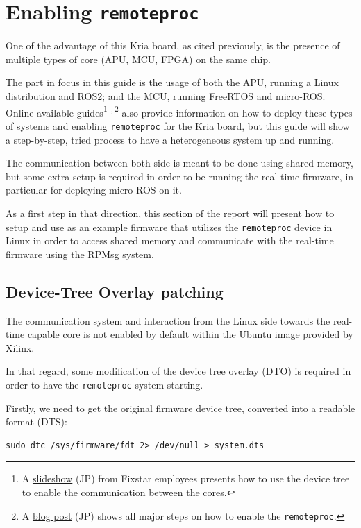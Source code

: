 \documentclass[10pt]{article}
\begin{document}
\section{Enabling \texttt{remoteproc}}
\label{sec:org0583105}
One of the advantage of this Kria board, as cited previously, is the presence of
multiple types of core (APU, MCU, FPGA) on the same chip.

The part in focus in this guide is the usage of both the APU, running
a Linux distribution and ROS2; and the MCU, running FreeRTOS and micro-ROS.
Online available guides\footnote{A \href{https://speakerdeck.com/fixstars/fpga-seminar-12-fixstars-corporation-20220727}{slideshow} (JP) from Fixstar employees presents how to use the device
tree to enable the communication between the cores.} \textsuperscript{,}\,\footnote{A \href{https://zenn.dev/ryuz88/articles/kv260\_setup\_memo\_ubuntu22 }{blog post} (JP) shows all major steps on how to enable the \texttt{remoteproc}.} also provide information on how to deploy these types
of systems and enabling \texttt{remoteproc} for the Kria board, but this guide
will show a step-by-step, tried process to have a heterogeneous system
up and running.

The communication between both side is meant to be done using shared memory, but
some extra setup is required in order to be running the real-time firmware, in particular
for deploying micro-ROS on it.

As a first step in that direction, this section of the report
will present how to setup and use as an example firmware that utilizes the
\texttt{remoteproc} device in Linux in order to access shared memory
and communicate with the real-time firmware using the RPMsg system.

\subsection{Device-Tree Overlay patching}
\label{sec:org61428c5}
The communication system and interaction from the Linux side towards the real-time capable core
is not enabled by default within the Ubuntu image provided by Xilinx.

In that regard, some modification of the device tree overlay (DTO) is required in order to have
the \texttt{remoteproc} system starting.

Firstly, we need to get the original firmware device tree, converted
into a readable format (DTS):

\begin{verbatim}
sudo dtc /sys/firmware/fdt 2> /dev/null > system.dts
\end{verbatim}
\end{document}
